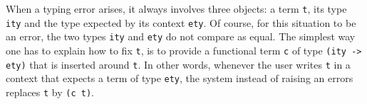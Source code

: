 % 
% 
% 


\mcbREQUIRE{}
\mcbPROVIDE{}
\label{sec:coercions}


When a typing error arises, it always involves three objects:
a term \lstinline/t/, its type \lstinline/ity/ and the type
expected by its context \lstinline/ety/.  Of course, for this
situation to be an error, the two types \lstinline/ity/ and
\lstinline/ety/ do not compare as equal.
The simplest way one has to explain \Coq{} how to fix \lstinline/t/,
is to provide a functional term \lstinline/c/ of type
\lstinline/(ity -> ety)/ that is inserted around \lstinline/t/.
In other words, whenever the user writes \lstinline/t/ in a context
that expects a term of type \lstinline/ety/, the system instead of
raising an errors replaces \lstinline/t/ by \lstinline/(c t)/.


